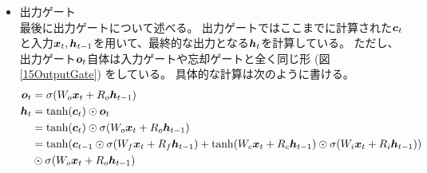 \begin{itemize}
  \item 出力ゲート\\
  最後に出力ゲートについて述べる。
  出力ゲートではここまでに計算された${\mbox{\boldmath{$c$}}}_{t}$と入力${\mbox{\boldmath{$x$}}}_t, {\mbox{\boldmath{$h$}}}_{t-1}$を用いて、最終的な出力となる${\mbox{\boldmath{$h$}}}_{t}$を計算している。
  ただし、出力ゲート${\mbox{\boldmath{$o$}}}_{t}$自体は入力ゲートや忘却ゲートと全く同じ形 (図\ref{15OutputGate}) をしている。
  具体的な計算は次のように書ける。
\begin{equation}
 \begin{split}
  {\mbox{\boldmath{$o$}}}_{t} 
  &= \sigma (W_o {\mbox{\boldmath{$x$}}}_t + R_o {\mbox{\boldmath{$h$}}}_{t-1})\\
  {\mbox{\boldmath{$h$}}}_{t} 
  &= \tanh({\mbox{\boldmath{$c$}}}_{t}) \odot {\mbox{\boldmath{$o$}}}_{t}\\
  &= \tanh({\mbox{\boldmath{$c$}}}_{t}) \odot \sigma (W_o {\mbox{\boldmath{$x$}}}_t + R_o {\mbox{\boldmath{$h$}}}_{t-1})\\
  &= \tanh({\mbox{\boldmath{$c$}}}_{t-1} \odot \sigma (W_f {\mbox{\boldmath{$x$}}}_t + R_f {\mbox{\boldmath{$h$}}}_{t-1}) 
  + \tanh (W_c {\mbox{\boldmath{$x$}}}_t + R_c {\mbox{\boldmath{$h$}}}_{t-1}) \odot \sigma (W_i {\mbox{\boldmath{$x$}}}_t + R_i {\mbox{\boldmath{$h$}}}_{t-1})) \\
  &\odot \sigma (W_o {\mbox{\boldmath{$x$}}}_t + R_o {\mbox{\boldmath{$h$}}}_{t-1})
 \end{split}
\end{equation}
\end{itemize}

